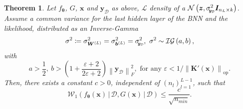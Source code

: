 \documentclass[a4paper, 11pt, reqno]{amsart}
\theoremstyle{plain}
\newtheorem{theorem}{Theorem}[section]
\theoremstyle{remark}
\theoremstyle{definition}
\newcommand{\given}{\, | \,}
\newcommand{\normal}[2]{\mathcal{N}\left(#1, #2\right)}
\newcommand{\invgamma}[2]{\mathcal{IG}\left(#1, #2\right)}
\newcommand{\wass}[3][2]{\mathcal{W}_{#1}\left(#2, #3\right)}
\newcommand{\norm}[1]{\left\lVert#1\right\rVert}
\let\epsilon\varepsilon
\newcommand{\train}{\mathcal{D}}
\newcommand{\sigmay}{\sigma_{\scalebox{0.65}{$\kern-3pt\bm{y}_{\mathcal{D}}$}}}%
\begin{document}
\begin{theorem} \label{thm:studposterior}
    Let $f_{\bm{\theta}}$, $G$, $\bm{x}$ and $\bm{y}_{\mathcal{D}}$ as above, $\mathcal{L}$ density of a $\normal{\bm{z}}{\sigmay^2 \bm{I}_{n_L \times k}}$. Assume a common variance for the last hidden layer of the BNN and the likelihood, distributed as an Inverse-Gamma 
    \begin{equation*}
        \sigma^2 \coloneqq \sigma_{\bm{W}^{(L)}}^2 = \sigma_{\bm{b}^{(L)}}^2 = \sigmay^2, \ \sigma^2 \sim \invgamma{a}{b},
    \end{equation*}
    with
    \begin{equation} \label{eq:abconstr}
        a > \frac{1}{2}, \ b > \left(1 + \frac{\epsilon + 2}{2\epsilon + 2}\right) \norm{\bm{y}_{\mathcal{D}}}_F^2, \text{ for any } \epsilon < 1/\norm{\bm{K}'(\bm{x})}_{\mathrm{op}}. 
    \end{equation}
    Then, there exists a constant $c > 0$, independent of $\left(n_l\right)_{l = 1}^{L - 1}$, such that
    \begin{equation*}
        \wass[1]{f_{\bm{\theta}}(\bm{x}) \given \train}{G(\bm{x}) \given \train} \leq \frac{c}{\sqrt{n_{min}}}.
    \end{equation*}
\end{theorem}
\end{document}
